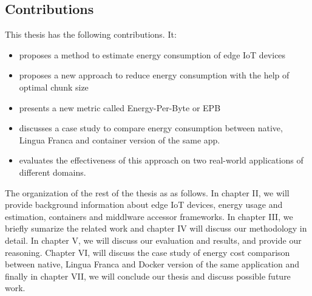 \subsection{Contributions}
This thesis has the following contributions. It: 
\begin{itemize}
    \item proposes a method to estimate energy consumption of edge IoT devices 
    \item proposes a new approach to reduce energy consumption with the help of optimal chunk size
    \item presents a new metric called Energy-Per-Byte or EPB
    \item discusses a case study to compare energy consumption between native, Lingua Franca 
    and container version of the same app.
    \item evaluates the effectiveness of this approach on two real-world applications of different domains.
\end{itemize}

The organization of the rest of the thesis as as follows. In chapter II, we will provide 
background information about edge IoT devices, energy usage and estimation, containers and middlware 
accessor frameworks. In chapter III, we briefly sumarize the related work and chapter IV will discuss 
our methodology in detail. In chapter V, we will discuss our evaluation and results, and provide 
our reasoning. Chapter VI, will discuss the case study of energy cost comparison between native, 
Lingua Franca and Docker version of the same application and finally in chapter VII, we will conclude 
our thesis and discuss possible future work.
